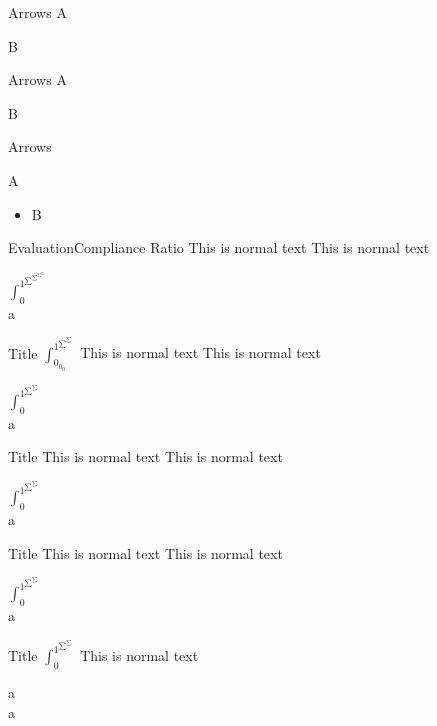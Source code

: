 \documentclass[english,notes]{beamer}
\begin{document}
\begin{frame}{Arrows}
\conclusionarrow{} A

\conclusionarrow{} B
\end{frame}

\begin{frame}{Arrows}
A

B
\end{frame}

\begin{frame}{Arrows}
\begin{arrowlist}
    \item A
\end{arrowlist}
\begin{itemize}
    \item B
\end{itemize}
\end{frame}

\begin{frame}{Evaluation}{Compliance Ratio}
    This is normal text
    This is normal text

    $\int_0^{1^{\sum^{\sum^{\sum^{\sum}}}}}$\\
    a
\end{frame}

\begin{frame}{Title $\int_{0_{0_0}}^{1^{\sum^\sum}}$}
    This is normal text
    This is normal text

    $\int_0^{1^{\sum^\sum}}$\\
    a
\end{frame}

\begin{frame}{Title}
    This is normal text
    This is normal text

    $\int_0^{1^{\sum^\sum}}$\\
    a
\end{frame}

\begin{frame}{Title}
    This is normal text
    This is normal text

    $\int_0^{1^{\sum^\sum}}$\\
    a
\end{frame}

\begin{frame}{Title $\int_0^{1^{\sum^\sum}}$}
    This is normal text

    a\\
    a
\end{frame}
\end{document}
